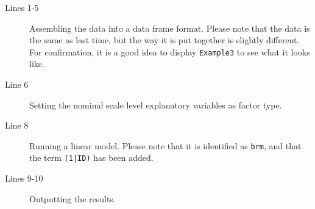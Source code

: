 \begin{description}
	\item[Lines 1-5] Assembling the data into a data frame format. Please note that the data is the same as last time, but the way it is put together is slightly different. For confirmation, it is a good idea to display \texttt{Example3} to see what it looks like.
	\item[Line 6] Setting the nominal scale level explanatory variables as factor type.
	\item[Line 8] Running a linear model. Please note that it is identified as \texttt{brm}, and that the term \texttt{(1|ID)} has been added.
	\item[Lines 9-10] Outputting the results.
\end{description}
